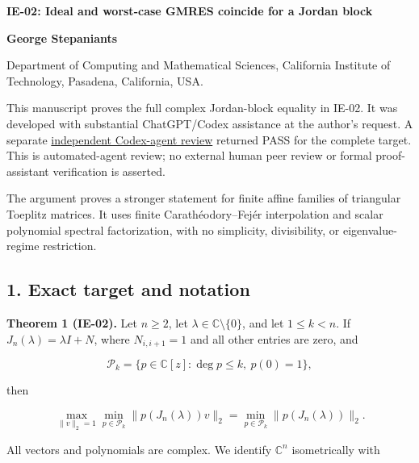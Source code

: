\documentclass[10pt,a4paper]{article}
\begin{document}
{\raggedright\Large\bfseries IE-02: Ideal and worst-case GMRES coincide
for a Jordan block\par}
\vspace{0.4em}
{\normalsize\bfseries George Stepaniants\par}
{\small Department of Computing and Mathematical Sciences, California
Institute of Technology, Pasadena, California, USA.\par}
\vspace{0.6em}
\pagestyle{plain}
\setlength{\abovedisplayskip}{6pt}
\setlength{\belowdisplayskip}{6pt}
\setlength{\abovedisplayshortskip}{4pt}
\setlength{\belowdisplayshortskip}{4pt}

This manuscript proves the full complex Jordan-block equality in IE-02.
It was developed with substantial ChatGPT/Codex assistance at the
author's request. A separate
\href{https://github.com/ajt60gaibb/OpenProblemsInNLA/blob/main/references/stepaniants-ie02-2026-09-11/verification/IE-02-independent-review.md}{independent
Codex-agent review} returned PASS for the complete target. This is
automated-agent review; no external human peer review or formal
proof-assistant verification is asserted.

The argument proves a stronger statement for finite affine families of
triangular Toeplitz matrices. It uses finite Carathéodory--Fejér
interpolation and scalar polynomial spectral factorization, with no
simplicity, divisibility, or eigenvalue-regime restriction.

\subsection{1. Exact target and
notation}\label{exact-target-and-notation}

\textbf{Theorem 1 (IE-02).} Let \(n\ge2\), let
\(\lambda\in\mathbb C\setminus\{0\}\), and let \(1\le k<n\). If
\(J_n(\lambda)=\lambda I+N\), where \(N_{i,i+1}=1\) and all other
entries are zero, and

\nopagebreak[4]

\[
\mathcal P_k=\{p\in\mathbb C[z]:\deg p\le k,\ p(0)=1\},
\]

then

\nopagebreak[4]

\[
\max_{\|v\|_2=1}\min_{p\in\mathcal P_k}\|p(J_n(\lambda))v\|_2
=\min_{p\in\mathcal P_k}\|p(J_n(\lambda))\|_2.
\tag{1}
\]

All vectors and polynomials are complex. We identify \(\mathbb C^n\)
isometrically with
\end{document}
